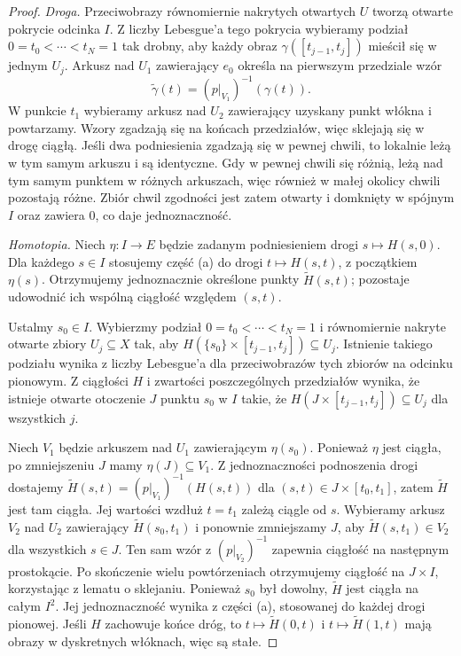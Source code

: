 \begin{proof}
\emph{Droga.} Przeciwobrazy równomiernie
nakrytych otwartych $U$ tworzą otwarte
pokrycie odcinka $I$. Z liczby Lebesgue'a
tego pokrycia wybieramy podział
$0=t_0<\cdots<t_N=1$ tak drobny, aby
każdy obraz $\gamma([t_{j-1},t_j])$
mieścił się w jednym $U_j$.
Arkusz nad $U_1$ zawierający $e_0$
określa na pierwszym przedziale wzór
\[
 \widetilde\gamma(t)
 =(p|_{V_1})^{-1}(\gamma(t)).
\]
W punkcie $t_1$ wybieramy arkusz nad $U_2$
zawierający uzyskany punkt włókna i powtarzamy.
Wzory zgadzają się na końcach przedziałów,
więc sklejają się w drogę ciągłą.
Jeśli dwa podniesienia zgadzają się w pewnej
chwili, to lokalnie leżą w tym samym arkuszu
i są identyczne. Gdy w pewnej chwili
się różnią, leżą nad tym samym punktem
w różnych arkuszach, więc również w małej
okolicy chwili pozostają różne. Zbiór
chwil zgodności jest zatem otwarty
i domknięty w spójnym $I$ oraz
zawiera $0$, co daje jednoznaczność.

\emph{Homotopia.} Niech
$\eta:I\to E$ będzie zadanym podniesieniem
drogi $s\mapsto H(s,0)$. Dla każdego $s\in I$
stosujemy część (a) do drogi $t\mapsto H(s,t)$,
z początkiem $\eta(s)$. Otrzymujemy jednoznacznie
określone punkty $\widetilde H(s,t)$; pozostaje
udowodnić ich wspólną ciągłość względem $(s,t)$.

Ustalmy $s_0\in I$. Wybierzmy podział
$0=t_0<\cdots<t_N=1$ i równomiernie nakryte
otwarte zbiory $U_j\subseteq X$ tak, aby
$H(\{s_0\}\times[t_{j-1},t_j])\subseteq U_j$.
Istnienie takiego podziału wynika z liczby
Lebesgue'a dla przeciwobrazów tych zbiorów
na odcinku pionowym. Z ciągłości $H$
i zwartości poszczególnych przedziałów
wynika, że istnieje otwarte otoczenie
$J$ punktu $s_0$ w $I$ takie, że
$H(J\times[t_{j-1},t_j])\subseteq U_j$
dla wszystkich $j$.

Niech $V_1$ będzie arkuszem nad $U_1$
zawierającym $\eta(s_0)$. Ponieważ $\eta$
jest ciągła, po zmniejszeniu $J$ mamy
$\eta(J)\subseteq V_1$. Z jednoznaczności
podnoszenia drogi dostajemy
$\widetilde H(s,t)=(p|_{V_1})^{-1}(H(s,t))$
dla $(s,t)\in J\times[t_0,t_1]$,
zatem $\widetilde H$ jest tam ciągła.
Jej wartości wzdłuż $t=t_1$ zależą ciągle od $s$.
Wybieramy arkusz $V_2$ nad $U_2$
zawierający $\widetilde H(s_0,t_1)$
i ponownie zmniejszamy $J$, aby
$\widetilde H(s,t_1)\in V_2$ dla wszystkich $s\in J$.
Ten sam wzór z $(p|_{V_2})^{-1}$
zapewnia ciągłość na następnym prostokącie.
Po skończenie wielu powtórzeniach
otrzymujemy ciągłość na $J\times I$,
korzystając z lematu o sklejaniu.
Ponieważ $s_0$ był dowolny, $\widetilde H$
jest ciągła na całym $I^2$.
Jej jednoznaczność wynika z części (a),
stosowanej do każdej drogi pionowej.
Jeśli $H$ zachowuje końce dróg, to
$t\mapsto\widetilde H(0,t)$ i
$t\mapsto\widetilde H(1,t)$ mają obrazy
w dyskretnych włóknach, więc są stałe.
\end{proof}

